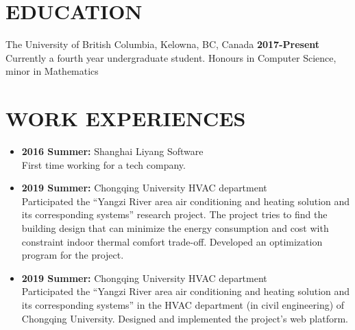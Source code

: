 \documentclass{res}
\begin{document}

\address{jimmy123good@hotmail.com \\ https://github.com/ailrk \\ https://ailrk.github.io/home \\ (250) 899 2600}
\begin{resume}

\section{EDUCATION}
The University of British Columbia, Kelowna, BC, Canada  \hspace{1.2in} \textbf{2017-Present}\\
    Currently a fourth year undergraduate student. Honours in Computer Science, minor in Mathematics \\

\section{WORK EXPERIENCES}
\begin{itemize}[leftmargin=-.2in]
    \setlength\itemsep{-1em}
    \item \textbf{2016 Summer:} Shanghai Liyang Software
    \vspace{0.05in}\\
    First time working for a tech company. \\
    \item \textbf{2019 Summer:} Chongqing University HVAC department
        \vspace{0.05in}\\ Participated the ``Yangzi River area air conditioning and heating solution and its corresponding systems'' research project. The project tries to find the building design that can minimize the energy consumption and cost with constraint indoor thermal comfort trade-off. Developed an optimization program for the project. \\
    \item \textbf{2019 Summer:} Chongqing University HVAC department
    \vspace{0.05in}\\
    Participated the ``Yangzi River area air conditioning and heating solution and its corresponding systems'' in the HVAC department (in civil engineering) of Chongqing University.  Designed and implemented the project's web platform. \\


\end{itemize}
\end{resume}
\end{document}
